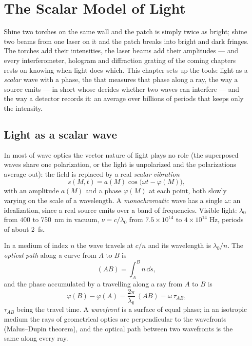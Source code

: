 \chapter{The Scalar Model of Light}\label{ch:b2:scalar-light-model}

Shine two torches on the same wall and the patch is simply twice as
bright; shine two beams from one laser on it and the patch breaks into
bright and dark fringes. The torches add their intensities, the laser
beams add their amplitudes --- and every interferometer, hologram and
diffraction grating of the coming chapters rests on knowing when light
does which. This chapter sets up the tools: light as a \emph{scalar}
wave with a phase, the \emph{} that measures that phase
along a ray, the way a source emits --- in short  whose
\emph{} decides whether two waves can interfere --- and
the way a detector records it: an average over billions of periods
that keeps only the intensity.

\section{Light as a scalar wave}

\begin{definition}\label{def:b2:scalar-light-model:scalar}
In most of wave optics the vector nature of light plays no role (the
superposed waves share one polarization, or the light is unpolarized
and the polarizations average out): the field is replaced by a real
\emph{scalar vibration}
\[
s(M, t) = a(M)\cos\bigl(\omega t - \varphi(M)\bigr) ,
\]
with an amplitude $a(M)$ and a phase $\varphi(M)$ at each point, both
slowly varying on the scale of a wavelength. A \emph{monochromatic}
wave has a single $\omega$: an idealization, since a real source emits
over a band of frequencies. Visible light: $\lambda_0$ from $400$ to
\qty{750}{nm} in vacuum, $\nu = c/\lambda_0$ from $7.5 \times 10^{14}$ to $4 \times 10^{14}$ Hz,
periods of about \qty{2}{fs}.
\end{definition}

\begin{definition}\label{def:b2:scalar-light-model:path}
In a medium of index $n$ the wave travels at $c/n$ and its wavelength
is $\lambda_0/n$. The \emph{optical path} along a curve from $A$ to $B$ is
\[
(AB) = \int_A^Bn\,\dd s ,
\]
and the phase accumulated by a  travelling along a
ray from $A$ to $B$ is
\[
\varphi(B) - \varphi(A) = \frac{2\pi}{\lambda_0}\,(AB) = \omega\,\tau_{AB} ,
\]
$\tau_{AB}$ being the travel time. A \emph{wavefront} is a surface of
equal phase; in an isotropic medium the rays of geometrical optics are
perpendicular to the wavefronts (Malus--Dupin theorem), and the optical
path between two wavefronts is the same along every ray.
\end{definition}

